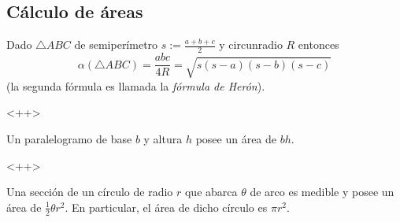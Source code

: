 \documentclass[11pt,a4paper]{book}
\begin{document}
\subsection*{Cálculo de áreas}
\begin{thm}
	Dado $\triangle ABC$ de semiperímetro $s:=\frac{a+b+c}{2}$ y circunradio $R$ entonces
	$$\alpha(\triangle ABC)=\frac{abc}{4R}=\sqrt{s(s-a)(s-b)(s-c)}$$
	(la segunda fórmula es llamada la \textit{fórmula de Herón}).
\end{thm}
<++>
\begin{thm}
Un paralelogramo de base $b$ y altura $h$ posee un área de $bh$.
\end{thm}
<++>
\begin{thm}
	Una sección de un círculo de radio $r$ que abarca $\theta$ de arco es medible y posee un área de $\frac{1}{2}\theta r^2$. En particular, el área de dicho círculo es $\pi r^2$.
\end{thm}
\end{document}
